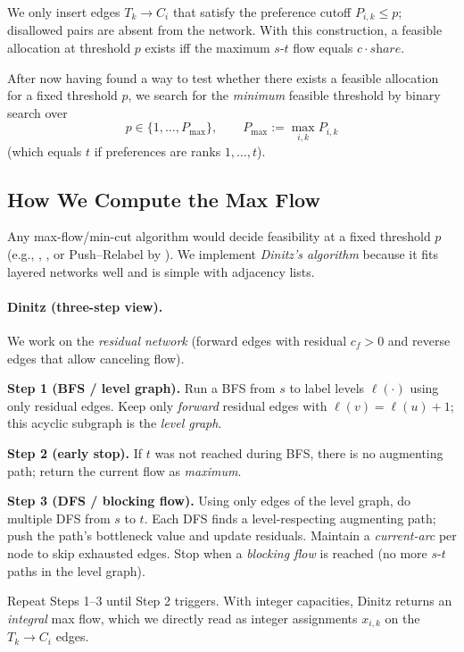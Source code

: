 \documentclass[a4paper,12pt,headsepline]{scrartcl}
\begin{document}
We only insert edges \(T_k \!\to\! C_i\) that satisfy the preference cutoff \(P_{i,k} \le p\); disallowed pairs are absent from the network. With this construction, a feasible allocation at threshold \(p\) exists iff the maximum \(s\)-\(t\) flow equals \(c \cdot \textit{share}\).

After now having found a way to test whether there exists a feasible allocation for a fixed threshold \(p\), we search for the \emph{minimum} feasible threshold by binary search over
\[
p \in \{1,\ldots,P_{\max}\}, \qquad P_{\max} := \max_{i,k} P_{i,k}
\]
(which equals \(t\) if preferences are ranks \(1,\ldots,t\)).

\subsection{How We Compute the Max Flow}

Any max-flow/min-cut algorithm would decide feasibility at a fixed threshold \(p\) (e.g., \cite{EdmondsKarp72}, \cite{Dinitz70}, or Push–Relabel by \cite{GoldbergTarjan88}). We implement \emph{Dinitz’s algorithm} because it fits layered networks well and is simple with adjacency lists.

\paragraph{Dinitz (three-step view).}
We work on the \emph{residual network} (forward edges with residual \(c_f>0\) and reverse edges that allow canceling flow).

\textbf{Step 1 (BFS / level graph).} Run a BFS from \(s\) to label levels \(\ell(\cdot)\) using only residual edges. Keep only \emph{forward} residual edges with \(\ell(v)=\ell(u)+1\); this acyclic subgraph is the \emph{level graph}.

\textbf{Step 2 (early stop).} If \(t\) was not reached during BFS, there is no augmenting path; return the current flow as \emph{maximum}.

\textbf{Step 3 (DFS / blocking flow).} Using only edges of the level graph, do multiple DFS from \(s\) to \(t\). Each DFS finds a level-respecting augmenting path; push the path’s bottleneck value and update residuals. Maintain a \emph{current-arc} per node to skip exhausted edges. Stop when a \emph{blocking flow} is reached (no more \(s\)-\(t\) paths in the level graph).

Repeat Steps 1–3 until Step 2 triggers. With integer capacities, Dinitz returns an \emph{integral} max flow, which we directly read as integer assignments \(x_{i,k}\) on the \(T_k\!\to C_i\) edges.
\end{document}
